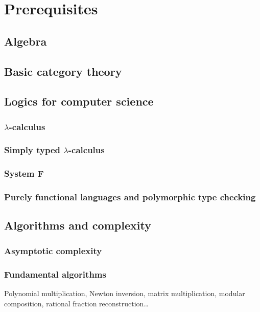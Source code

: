 

\part{Prerequisites}

\chapter{Algebra}
\label{cha:algebra}


\chapter{Basic category theory}
\label{cha:basic-categ-theory}


\chapter{Logics for computer science}
\label{cha:logics-comp-science}
\section{$\lambda$-calculus}
\label{sec:lambda-calculus}
\section{Simply typed $\lambda$-calculus}
\label{sec:simply-typed-lambda}
\section{System F}
\label{sec:system-f}
\section{Purely functional languages and polymorphic type checking}
\label{sec:purely-funct-lang}


\chapter{Algorithms and complexity}
\label{cha:algor-compl}
\section{Asymptotic complexity}
\section{Fundamental algorithms}
Polynomial multiplication, Newton inversion, matrix multiplication,
modular composition, rational fraction reconstruction\ldots




